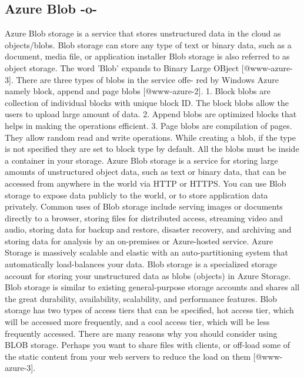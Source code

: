   
\subsection{Azure Blob -o-}

Azure Blob storage is a service that stores unstructured data in the
cloud as objects/blobs. Blob storage can store any type of text or
binary data, such as a document, media file, or application installer
Blob storage is also referred to as object storage. The word 'Blob'
expands to Binary Large OBject [@www-azure-3]. There are three
types of blobs in the service offe- red by Windows Azure namely block,
append and page blobs [@www-azure-2].  1. Block blobs are
collection of individual blocks with unique block ID.  The block blobs
allow the users to upload large amount of data.  2. Append blobs are
optimized blocks that helps in making the operations efficient.
3. Page blobs are compilation of pages. They allow random read and
write operations. While creating a blob, if the type is not specified
they are set to block type by default. All the blobs must be inside a
container in your storage.  Azure Blob storage is a service for
storing large amounts of unstructured object data, such as text or
binary data, that can be accessed from anywhere in the world via HTTP
or HTTPS. You can use Blob storage to expose data publicly to the
world, or to store application data privately. Common uses of Blob
storage include serving images or documents directly to a browser,
storing files for distributed access, streaming video and audio,
storing data for backup and restore, disaster recovery, and archiving
and storing data for analysis by an on-premises or Azure-hosted
service.  Azure Storage is massively scalable and elastic with an
auto-partitioning system that automatically load-balances your
data. Blob storage is a specialized storage account for storing your
unstructured data as blobs (objects) in Azure Storage. Blob storage is
similar to existing general-purpose storage accounts and shares all
the great durability, availability, scalability, and performance
features. Blob storage has two types of access tiers that can be
specified, hot access tier, which will be accessed more frequently,
and a cool access tier, which will be less frequently accessed. There
are many reasons why you should consider using BLOB storage. Perhaps
you want to share files with clients, or off-load some of the static
content from your web servers to reduce the load on
them [@www-azure-3].



